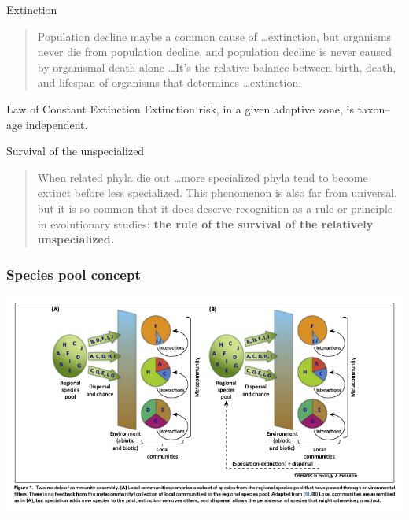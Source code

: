 \documentclass{beamer}
\begin{document}
\begin{frame}
  \begin{block}{Extinction}
    \begin{quote}
      Population decline maybe a common cause of \dots extinction, but organisms never die from population decline, and population decline is never caused by organismal death alone \dots It's the relative balance between birth, death, and lifespan of organisms that determines \dots extinction. 
    \end{quote}
  \end{block}
  
  \small{}
\end{frame}

\begin{frame}
  \begin{alertblock}{Law of Constant Extinction}
    Extinction risk, in a given adaptive zone, is taxon--age independent.
  \end{alertblock}

  \small{}
\end{frame}

\begin{frame}
  \begin{block}{Survival of the unspecialized}
    \begin{quote}
      When related phyla die out \dots more specialized phyla tend to become extinct before less specialized. This phenomenon is also far from universal, but it is so common that it does deserve recognition as a rule or principle in evolutionary studies: \textbf{the rule of the survival of the relatively unspecialized.}
    \end{quote}
  \end{block}

  \small{}
\end{frame}


\begin{frame}
  \frametitle{Species pool concept}

  \begin{center}
    \includegraphics[height=0.8\textheight,width=\textwidth,keepaspectratio=true]{figure/schemske_pool}
  \end{center}

\end{frame}
\end{document}
